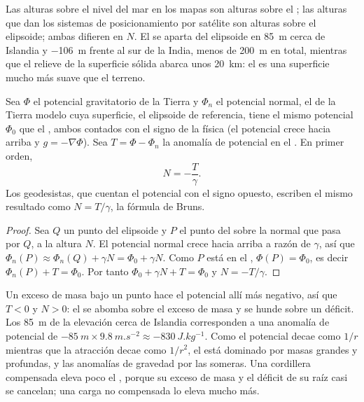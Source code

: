 Las alturas sobre el nivel del mar en los mapas son alturas sobre el ; las alturas que dan los sistemas de posicionamiento por
satélite son alturas sobre el elipsoide; ambas difieren en $N$. El  se aparta del elipsoide en \qty{+85}{m} cerca de Islandia y
\qty{-106}{m} frente al sur de la India, menos de \qty{200}{m} en total, mientras que el relieve de la superficie sólida abarca unos
\qty{20}{km}: el  es una superficie mucho más suave que el terreno.

\begin{proposition}\label{prop:b1:isostasy-gravity:bruns}
Sea $\Phi$ el potencial gravitatorio de la Tierra y $\Phi_n$ el potencial normal, el de la Tierra modelo cuya superficie, el elipsoide
de referencia, tiene el mismo potencial $\Phi_0$ que el , ambos contados con el signo de la física (el potencial crece hacia
arriba y $g = -\nabla\Phi$). Sea $T = \Phi - \Phi_n$ la anomalía de potencial en el . En primer orden,
\[
  N = -\frac{T}{\gamma} .
\]
Los geodesistas, que cuentan el potencial con el signo opuesto, escriben el mismo resultado como $N = T/\gamma$, la fórmula de Bruns.
\end{proposition}

\begin{proof}
Sea $Q$ un punto del elipsoide y $P$ el punto del  sobre la normal que pasa por $Q$, a la altura $N$. El potencial normal
crece hacia arriba a razón de $\gamma$, así que $\Phi_n(P) \approx \Phi_n(Q) + \gamma N = \Phi_0 +
\gamma N$. Como $P$ está en el , $\Phi(P) = \Phi_0$, es decir
$\Phi_n(P) + T = \Phi_0$. Por tanto $\Phi_0 + \gamma N + T = \Phi_0$ y $N =
-T/\gamma$.
\end{proof}

Un exceso de masa bajo un punto hace el potencial allí más negativo, así que $T < 0$ y $N > 0$: el  se abomba sobre el exceso
de masa y se hunde sobre un déficit. Los \qty{85}{m} de la elevación cerca de Islandia corresponden a una anomalía de potencial de
$-\qty{85}{m}\times\qty{9.8}{m.s^{-2}} \approx \qty{-830}{J.kg^{-1}}$. Como el potencial decae como $1/r$ mientras que la atracción
decae como $1/r^2$, el  está dominado por masas grandes y profundas, y las anomalías de gravedad por las someras. Una cordillera
compensada eleva poco el , porque su exceso de masa y el déficit de su raíz casi se cancelan; una carga no compensada lo eleva
mucho más.

